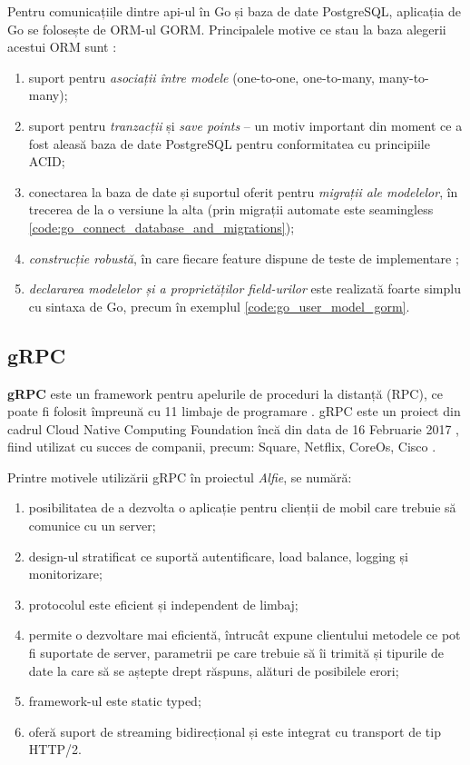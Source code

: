 Pentru comunicațiile dintre api-ul în Go și baza de date PostgreSQL, aplicația de Go se folosește de ORM-ul GORM. Principalele motive ce stau la baza alegerii acestui ORM sunt \cite{gormOverview}:
\begin{enumerate}
    \item suport pentru \textit{asociații între modele} (one-to-one, one-to-many, many-to-many);
    \item suport pentru \textit{tranzacții} și \textit{save points} – un motiv important din moment ce a fost aleasă baza de date PostgreSQL pentru conformitatea cu principiile ACID;
    \item conectarea la baza de date și suportul oferit pentru \textit{migrații ale modelelor}, în trecerea de la o versiune la alta (prin migrații automate este seamingless \ref{code:go_connect_database_and_migrations});
    \item \textit{construcție robustă}, în care fiecare feature dispune de teste de implementare \cite{gormTest};
    \item \textit{declararea modelelor și a proprietăților field-urilor} este realizată foarte simplu cu sintaxa de Go, precum în exemplul \ref{code:go_user_model_gorm}.
\end{enumerate}

\subsection{gRPC}

\textbf{gRPC} este un framework pentru apelurile de proceduri la distanță (RPC), ce poate fi folosit împreună cu 11 limbaje de programare \cite{grpcFAQ}. gRPC este un proiect din cadrul Cloud Native Computing Foundation încă din data de 16 Februarie 2017 \cite{grpcCNCF}, fiind utilizat cu succes de companii, precum: Square, Netflix, CoreOs, Cisco \cite{grpcIO}.

Printre motivele utilizării gRPC în proiectul \textit{Alfie}, se numără:
\begin{enumerate}
    \item posibilitatea de a dezvolta o aplicație pentru clienții de mobil care trebuie să comunice cu un server;
    \item design-ul stratificat ce suportă autentificare, load balance, logging și monitorizare;
    \item protocolul este eficient și independent de limbaj;
    \item permite o dezvoltare mai eficientă, întrucât expune clientului metodele ce pot fi suportate de server, parametrii pe care trebuie să îi trimită și tipurile de date la care să se aștepte drept răspuns, alături de posibilele erori;
    \item framework-ul este static typed;
    \item oferă suport de streaming bidirecțional și este integrat cu transport de tip HTTP/2.
\end{enumerate}

